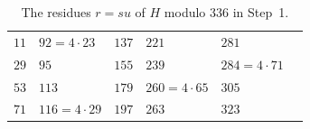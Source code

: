\documentclass[11pt]{article}
\begin{document}
\begin{table}[ht]
\centering\footnotesize
\caption{The residues $r=su$ of $H$ modulo $336$ in Step~1.}\label{tab:res}
\begin{tabular}{llllll}
\hline
$11$ & $92=4\cdot23$ & $137$ & $221$ & $281$ & \\
$29$ & $95$ & $155$ & $239$ & $284=4\cdot71$ & \\
$53$ & $113$ & $179$ & $260=4\cdot65$ & $305$ & \\
$71$ & $116=4\cdot29$ & $197$ & $263$ & $323$ & \\
\hline
\end{tabular}
\end{table}
\end{document}

